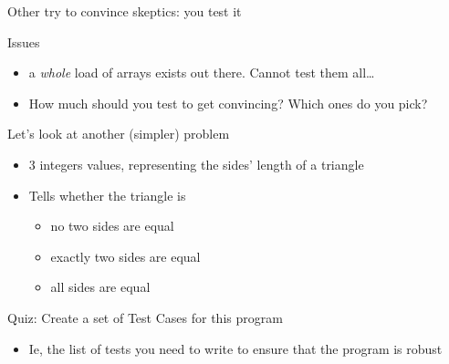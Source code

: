 \begin{frame}{Other try to convince skeptics: \alert{you test it}}
  \begin{block}{Issues} 
    \begin{itemize}
    \item a \textit{whole} load of arrays exists out there. Cannot test them
      all\ldots
     \item How much should you test to get convincing?
       Which ones do you pick?
   \end{itemize}
  \end{block}

  \begin{block}{Let's look at another (simpler) problem}
    \begin{itemize}
    \item {} 3 integers values, representing the sides'
      length of a triangle
    \item {} Tells whether the triangle is
      \begin{itemize}
      \item {} no two sides are equal
      \item {} exactly two sides are equal
      \item {} all sides are equal
      \end{itemize}
    \end{itemize}
  \end{block}

  \begin{alertblock}{Quiz: Create a set of Test Cases for this program}
    \begin{itemize}
    \item Ie, the list of tests you need to write to ensure that the program is robust
    \end{itemize}
  \end{alertblock}
\end{frame}
